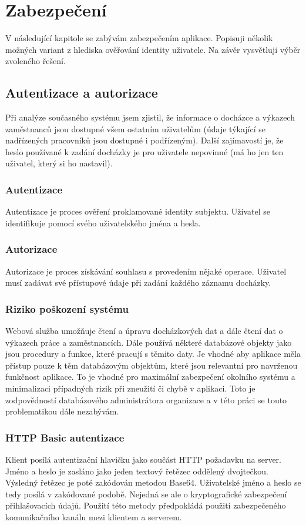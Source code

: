 \documentclass{diplomka}
\begin{document}
\chapter{Zabezpečení}
V následující kapitole se zabývám zabezpečením aplikace. Popisuji několik možných variant z hlediska ověřování identity uživatele. Na závěr vysvětluji výběr zvoleného řešení.
\section{Autentizace a autorizace}
Při analýze současného systému jsem zjistil, že informace o docházce a výkazech zaměstnanců jsou dostupné všem ostatním uživatelům (údaje týkající se nadřízených pracovníků jsou dostupné i podřízeným). Další zajímavostí je, že heslo používané k zadání docházky je pro uživatele nepovinné (má ho jen ten uživatel, který si ho nastavil). 

\subsection*{Autentizace}
Autentizace je proces ověření proklamované identity subjektu. Uživatel se identifikuje pomocí svého uživatelského jména a hesla.

\subsection*{Autorizace}
Autorizace je proces získávání souhlasu s provedením nějaké operace. Uživatel musí zadávat své přístupové údaje při zadání každého záznamu docházky. 

\subsection*{Riziko poškození systému}
Webová služba umožňuje čtení a úpravu docházkových dat a dále čtení dat o výkazech práce a zaměstnancích. Dále používá některé databázové objekty jako jsou procedury a funkce, které pracují s těmito daty. Je vhodné aby aplikace měla přístup pouze k těm databázovým objektům, které jsou relevantní pro navrženou funkčnost aplikace. To je vhodné pro maximální zabezpečení okolního systému a minimalizaci případných rizik při zneužití či chybě v aplikaci. Toto je zodpovědností databázového administrátora organizace a v této práci se touto problematikou dále nezabývám.

\subsection*{HTTP Basic autentizace}
Klient posílá autentizační hlavičku jako součást HTTP požadavku na server. Jméno a heslo je zasláno jako jeden textový řetězec oddělený dvojtečkou. Výsledný řetězec je poté zakódován metodou Base64. Uživatelské jméno a heslo se tedy posílá v zakódované podobě. Nejedná se ale o kryptografické zabezpečení přihlašovacích údajů. Použití této metody předpokládá použití zabezpečeného komunikačního kanálu mezi klientem a serverem.
\end{document}
